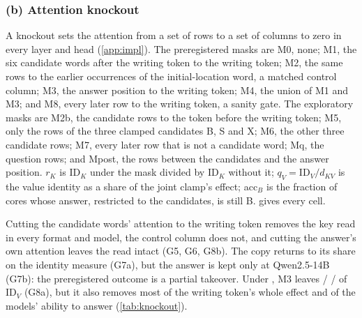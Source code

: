 \subsubsection{(b) Attention knockout}\label{app:g-knockout}

A knockout sets the attention from a set of rows to a set of columns to zero in every layer and head (\cref{app:impl}). The preregistered masks are M0, none; M1, the six candidate words after the writing token to the writing token; M2, the same rows to the earlier occurrences of the initial-location word, a matched control column; M3, the answer position to the writing token; M4, the union of M1 and M3; and M8, every later row to the writing token, a sanity gate. The exploratory masks are M2b, the candidate rows to the token before the writing token; M5, only the rows of the three clamped candidates B, S and X; M6, the other three candidate rows; M7, every later row that is not a candidate word; Mq, the question rows; and Mpost, the rows between the candidates and the answer position. $r_K$ is $\mathrm{ID}_K$ under the mask divided by $\mathrm{ID}_K$ without it; $q_V = \mathrm{ID}_V/d_{KV}$ is the value identity as a share of the joint clamp's effect; acc$_B$ is the fraction of cores whose answer, restricted to the candidates, is still B.  gives every cell.

\begin{table}[!ht]
\centering
\small
\caption{\textbf{Attention knockout} (preregistration G, part (b); masks in the text). $r_K$: $\mathrm{ID}_K$ under the mask relative to no mask; $q_V$: $\mathrm{ID}_V$ as a share of the joint clamp's effect $d_{KV}$; acc$_B$: fraction of cores whose candidate-restricted answer is B. $n = 150$ cores per cell. M1, M2, M3, M4 and M8 enter G5--G8 and Gate b; the other masks, and every mask under \fmtPost{}, are exploratory. Under \fmtNone{} only the masks that do not need candidate rows are defined.}
\label{tab:knockout}

\end{table}

Cutting the candidate words' attention to the writing token removes the key read in every format and model, the control column does not, and cutting the answer's own attention leaves the read intact (G5, G6, G8b). The copy returns to its \fmtNone{} share on the identity measure (G7a), but the answer is kept only at Qwen2.5-14B (G7b): the preregistered outcome is a partial takeover. Under \fmtNone{}, M3 leaves \GeightaRatioQwenSeven{} / \GeightaRatioQwenFourteen{} / \GeightaRatioMistralSeven{} of $\mathrm{ID}_V$ (G8a), but it also removes most of the writing token's whole effect and of the models' ability to answer (\cref{tab:knockout}).

